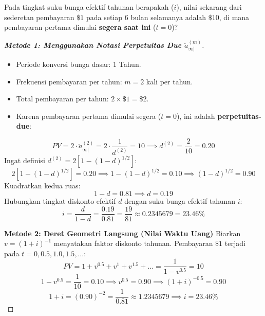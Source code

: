 \documentclass[11pt,a4paper]{article}
\begin{document}
\begin{examplebox}
Pada tingkat suku bunga efektif tahunan berapakah ($i$), nilai sekarang dari sederetan pembayaran $\$1$ pada setiap 6 bulan selamanya adalah $\$10$, di mana pembayaran pertama dimulai \textbf{segera saat ini} ($t=0$)?
\end{examplebox}

\begin{proof}[\textbf{Metode 1: Menggunakan Notasi Perpetuitas Due $\ddot{a}_{\overline{\infty}|}^{(m)}$}]
\begin{itemize}
    \item Periode konversi bunga dasar: 1 Tahun.
    \item Frekuensi pembayaran per tahun: $m = 2$ kali per tahun.
    \item Total pembayaran per tahun: $2 \times \$1 = \$2$.
    \item Karena pembayaran pertama dimulai segera ($t=0$), ini adalah \textbf{perpetuitas-due}:
\end{itemize}
\begin{equation*}
    PV = 2 \cdot \ddot{a}_{\overline{\infty}|}^{(2)} = 2 \cdot \frac{1}{d^{(2)}} = 10 \implies d^{(2)} = \frac{2}{10} = 0.20
\end{equation*}
Ingat definisi $d^{(2)} = 2 \left[ 1 - (1-d)^{1/2} \right]$:
\begin{equation*}
    2 \left[ 1 - (1-d)^{1/2} \right] = 0.20 \implies 1 - (1-d)^{1/2} = 0.10 \implies (1-d)^{1/2} = 0.90
\end{equation*}
Kuadratkan kedua ruas:
\begin{equation*}
    1 - d = 0.81 \implies d = 0.19
\end{equation*}
Hubungkan tingkat diskonto efektif $d$ dengan suku bunga efektif tahunan $i$:
\begin{equation*}
    i = \frac{d}{1-d} = \frac{0.19}{0.81} = \frac{19}{81} \approx \mathbf{0.2345679} = \mathbf{23.46\%}
\end{equation*}

\vspace{0.5em}
\textbf{Metode 2: Deret Geometri Langsung (Nilai Waktu Uang)}
Biarkan $v = (1+i)^{-1}$ menyatakan faktor diskonto tahunan. Pembayaran $\$1$ terjadi pada $t = 0, 0.5, 1.0, 1.5, \dots$:
\begin{equation*}
    PV = 1 + v^{0.5} + v^1 + v^{1.5} + \dots = \frac{1}{1 - v^{0.5}} = 10
\end{equation*}
\begin{equation*}
    1 - v^{0.5} = \frac{1}{10} = 0.10 \implies v^{0.5} = 0.90 \implies (1+i)^{-0.5} = 0.90
\end{equation*}
\begin{equation*}
    1 + i = (0.90)^{-2} = \frac{1}{0.81} \approx 1.2345679 \implies i = \mathbf{23.46\%}
\end{equation*}
\end{proof}
\end{document}
